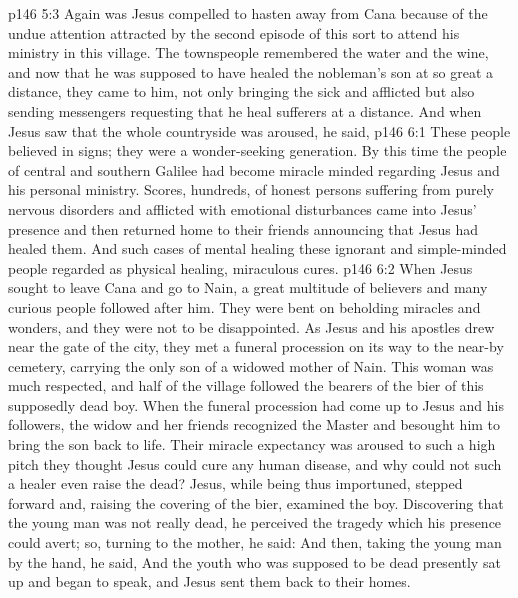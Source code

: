 \vs p146 5:3 Again was Jesus compelled to hasten away from Cana because of the undue attention attracted by the second episode of this sort to attend his ministry in this village. The townspeople remembered the water and the wine, and now that he was supposed to have healed the nobleman’s son at so great a distance, they came to him, not only bringing the sick and afflicted but also sending messengers requesting that he heal sufferers at a distance. And when Jesus saw that the whole countryside was aroused, he said, 
\vs p146 6:1 These people believed in signs; they were a wonder\hyp{}seeking generation. By this time the people of central and southern Galilee had become miracle minded regarding Jesus and his personal ministry. Scores, hundreds, of honest persons suffering from purely nervous disorders and afflicted with emotional disturbances came into Jesus’ presence and then returned home to their friends announcing that Jesus had healed them. And such cases of mental healing these ignorant and simple\hyp{}minded people regarded as physical healing, miraculous cures.
\vs p146 6:2 \pc When Jesus sought to leave Cana and go to Nain, a great multitude of believers and many curious people followed after him. They were bent on beholding miracles and wonders, and they were not to be disappointed. As Jesus and his apostles drew near the gate of the city, they met a funeral procession on its way to the near\hyp{}by cemetery, carrying the only son of a widowed mother of Nain. This woman was much respected, and half of the village followed the bearers of the bier of this supposedly dead boy. When the funeral procession had come up to Jesus and his followers, the widow and her friends recognized the Master and besought him to bring the son back to life. Their miracle expectancy was aroused to such a high pitch they thought Jesus could cure any human disease, and why could not such a healer even raise the dead? Jesus, while being thus importuned, stepped forward and, raising the covering of the bier, examined the boy. Discovering that the young man was not really dead, he perceived the tragedy which his presence could avert; so, turning to the mother, he said:  And then, taking the young man by the hand, he said,  And the youth who was supposed to be dead presently sat up and began to speak, and Jesus sent them back to their homes.
